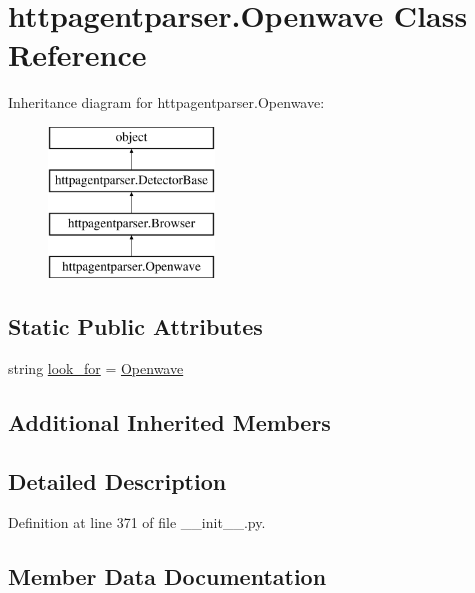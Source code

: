 \hypertarget{classhttpagentparser_1_1_openwave}{}\section{httpagentparser.\+Openwave Class Reference}
\label{classhttpagentparser_1_1_openwave}
Inheritance diagram for httpagentparser.\+Openwave\+:\begin{figure}[H]
\begin{center}
\leavevmode
\includegraphics[height=4.000000cm]{classhttpagentparser_1_1_openwave}
\end{center}
\end{figure}
\subsection*{Static Public Attributes}
\begin{DoxyCompactItemize}
\item 
string \hyperlink{classhttpagentparser_1_1_openwave_a05a58ed1b6f838230c189930cf916f5d}{look\+\_\+for} = \textquotesingle{}\hyperlink{classhttpagentparser_1_1_openwave}{Openwave}\textquotesingle{}
\end{DoxyCompactItemize}
\subsection*{Additional Inherited Members}


\subsection{Detailed Description}


Definition at line 371 of file \+\_\+\+\_\+init\+\_\+\+\_\+.\+py.



\subsection{Member Data Documentation}
\hypertarget{classhttpagentparser_1_1_openwave_a05a58ed1b6f838230c189930cf916f5d}{}\label{classhttpagentparser_1_1_openwave_a05a58ed1b6f838230c189930cf916f5d} 
